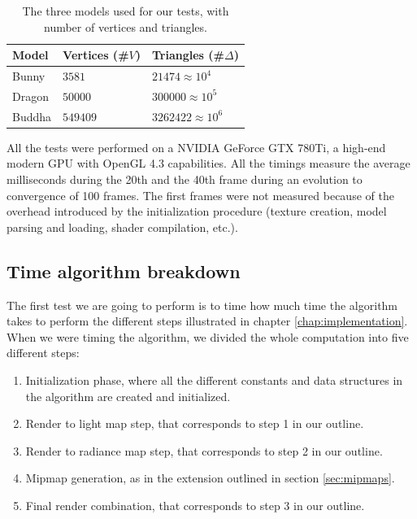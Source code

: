 \begin{table}[!ht]
\centering
\begin{tabular}{|l|l|l|}
\hline
Model  & Vertices (\#$V$) & Triangles (\#$\Delta$) \\ \hline
Bunny  & $3581$                                   & $21474 \approx 10^4$                           \\ \hline
Dragon & $50000$                                  & $300000 \approx 10^5$                          \\ \hline
Buddha & $549409$                                 & $3262422 \approx 10^6$                         \\ \hline
\end{tabular}
\caption{The three models used for our tests, with number of vertices and triangles.}
\label{table:models}
\end{table}

All the tests were performed on a NVIDIA GeForce GTX 780Ti, a high-end modern GPU with OpenGL 4.3 capabilities. All the timings measure the average milliseconds during the 20th and the 40th frame during an evolution to convergence of 100 frames. The first frames were not measured because of the overhead introduced by the initialization procedure (texture creation, model parsing and loading, shader compilation, etc.).

\subsection{Time algorithm breakdown}

The first test we are going to perform is to time how much time the algorithm takes to perform the different steps illustrated in chapter \ref{chap:implementation}. When we were timing the algorithm, we divided the whole computation into five different steps:

\begin{enumerate}
	\item Initialization phase, where all the different constants and data structures in the algorithm are created and initialized.
	\item Render to light map step, that corresponds to step 1 in our outline.
	\item Render to radiance map step, that corresponds to step 2 in our outline.
	\item Mipmap generation, as in the extension outlined in section \ref{sec:mipmaps}.
	\item Final render combination, that corresponds to step 3 in our outline.
\end{enumerate}

